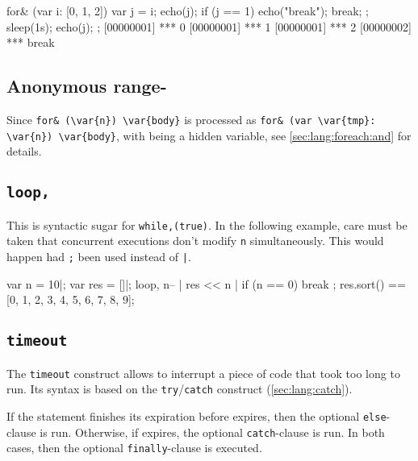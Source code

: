 \begin{urbiscript}
for& (var i: [0, 1, 2])
{
  var j = i;
  echo(j);
  if (j == 1)
  {
    echo("break");
    break;
  };
  sleep(1s);
  echo(j);
};
[00000001] *** 0
[00000001] *** 1
[00000001] *** 2
[00000002] *** break
\end{urbiscript}

\subsection{Anonymous range-\forAnd}
\label{sec:lang:forn:and}

Since \lstinline|for& (\var{n}) \var{body}| is processed as
\lstinline|for& (var \var{tmp}: \var{n}) \var{body}|, with  being a
hidden variable, see \autoref{sec:lang:foreach:and} for details.


\subsection{\lstinline{loop,}}
\label{sec:lang:loop:comma}
\experimentalremoved{}

This is syntactic sugar for \lstinline|while,(true)|.  In the following
example, care must be taken that concurrent executions don't modify
\lstinline{n} simultaneously.  This would happen had \lstinline|;| been used
instead of \lstinline'|'.

\begin{urbiassert}
{
  var n = 10|;
  var res = []|;
  loop,
  {
    n-- |
    res << n |
    if (n == 0)
      break
  };
  res.sort()
}
==
[0, 1, 2, 3, 4, 5, 6, 7, 8, 9];
\end{urbiassert}

\subsection{\lstinline{timeout}}
\label{sec:lang:timeout}

The \lstinline{timeout} construct allows to interrupt a piece of code that
took too long to run.  Its syntax is based on the
\lstinline{try}/\lstinline{catch} construct (\autoref{sec:lang:catch}).


If the statement finishes its expiration before  expires, then
the optional \lstinline{else}-clause is run.  Otherwise, if 
expires, the optional \lstinline{catch}-clause is run.  In both cases, then
the optional \lstinline{finally}-clause is executed.

